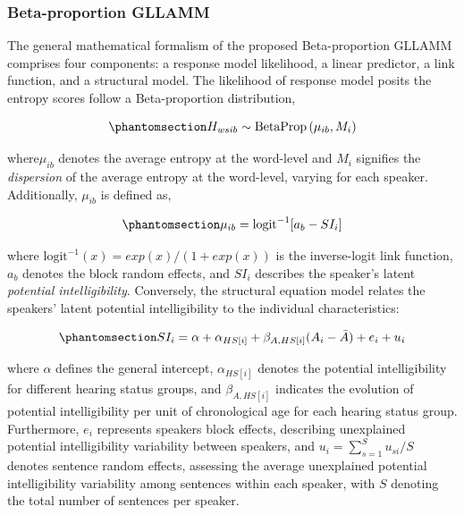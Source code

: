 \documentclass[
]{agujournal2019}
\begin{document}
\subsubsection{Beta-proportion GLLAMM}\label{sec-M-SM-BGLLAMM}

The general mathematical formalism of the proposed Beta-proportion
GLLAMM comprises four components: a response model likelihood, a linear
predictor, a link function, and a structural model. The likelihood of
response model posits the entropy scores follow a Beta-proportion
distribution,

\begin{equation}\phantomsection\label{eq-beta-GLLAMM-likelihood}{
H_{wsib} \sim \text{BetaProp} \left( \mu_{ib}, M_{i} \right)
}\end{equation}

where\(\mu_{ib}\) denotes the average entropy at the word-level and
\(M_{i}\) signifies the \emph{dispersion} of the average entropy at the
word-level, varying for each speaker. Additionally, \(\mu_{ib}\) is
defined as,

\begin{equation}\phantomsection\label{eq-beta-GLLAMM-linpred}{
\mu_{ib} = \text{logit}^{-1}[ a_{b} - SI_{i} ]
}\end{equation}

where \(\text{logit}^{-1}(x) = exp(x) / (1+exp(x))\) is the
inverse-logit link function, \(a_{b}\) denotes the block random effects,
and \(SI_{i}\) describes the speaker's latent \emph{potential
intelligibility}. Conversely, the structural equation model relates the
speakers' latent potential intelligibility to the individual
characteristics:

\begin{equation}\phantomsection\label{eq-beta-GLLAMM-structural}{
SI_{i} = \alpha + \alpha_{HS[i]} + \beta_{A, HS[i]} (A_{i} - \bar{A}) + e_{i} + u_{i}
}\end{equation}

where \(\alpha\) defines the general intercept, \(\alpha_{HS[i]}\)
denotes the potential intelligibility for different hearing status
groups, and \(\beta_{A,HS[i]}\) indicates the evolution of potential
intelligibility per unit of chronological age for each hearing status
group. Furthermore, \(e_{i}\) represents speakers block effects,
describing unexplained potential intelligibility variability between
speakers, and \(u_{i} = \sum_{s=1}^{S} u_{si}/S\) denotes sentence
random effects, assessing the average unexplained potential
intelligibility variability among sentences within each speaker, with
\(S\) denoting the total number of sentences per speaker.
\end{document}
